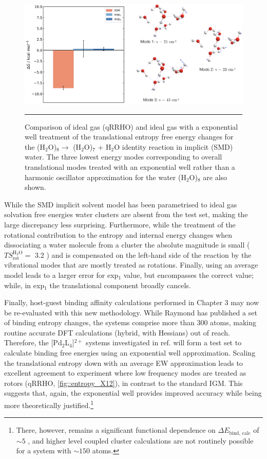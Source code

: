 \documentclass[../main.tex]{subfiles}
\begin{document}
\begin{figure}[h!]
	\centering
	\includegraphics[width=15cm]{4/figs/figX11/figX11}
	\vspace{0.2cm}
	\hrule
	\caption{Comparison of ideal gas (qRRHO) and ideal gas with a exponential well treatment of the translational entropy free energy changes for the (H$_2$O)$_8 \longrightarrow$ (H$_2$O)$_7$ +  H$_2$O identity reaction in implicit (SMD) water. The three lowest energy modes corresponding to overall translational modes treated with an exponential well rather than a harmonic oscillator approximation for the water (H$_2$O)$_8$ are also shown.} 
	\label{fig::entropy_X11}
\end{figure}

While the SMD implicit solvent model has been parametrised to ideal gas solvation free energies water clusters are absent from the test set,\cite{Marenich2009} making the large discrepancy less surprising. Furthermore, while the treatment of the rotational contribution to the entropy and internal energy changes when dissociating a water molecule from a cluster the absolute magnitude is small ($TS_\text{rot}^{\text{H}{}_2\text{O}} =$ 3.2 \kcal) and is compensated on the left-hand side of the reaction by the vibrational modes that are mostly treated as rotations. Finally, using an average model leads to a larger error for exp$_1$ value, but encompasses the correct value; while, in exp$_1$ the translational component broadly cancels.


\newpage
Finally, host-guest binding affinity calculations performed in Chapter 3 may now be re-evaluated with this new methodology.  While Raymond has published a set of binding entropy changes,\cite{Leung2008} the systems comprise more than 300 atoms, making routine accurate DFT calculations (hybrid, with Hessians) out of reach. Therefore, the [Pd$_2$L$_4$]${}^{2+}$ systems investigated in ref. \cite{Young2019} will form a test set to calculate binding free energies using an exponential well approximation. Scaling the translational entropy down with an average EW approximation leads to excellent agreement to experiment where low frequency modes are treated as rotors (qRRHO, \figurename{ \ref{fig::entropy_X12}}), in contrast to the standard IGM. This suggests that, again, the exponential well provides improved accuracy while being more theoretically justified.\footnote{There, however, remains a significant functional dependence on $\Delta E_\text{bind, calc}$ of $\sim 5$ \kcal, and higher level coupled cluster calculations are not routinely possible for a system with $\sim 150$ atoms.}
\end{document}
